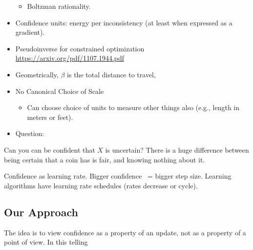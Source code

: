 \documentclass{article}
\begin{document}
\begin{itemize}
\begin{itemize}
    \item Boltzman rationality.
\end{itemize}


\item Confidence units: energy per inconsistency (at least when expressed as a gradient).

\item Pseudoinverse for constrained optimization
    \url{https://arxiv.org/pdf/1107.1944.pdf}

\item Geometrically, $\beta$ is the total distance to travel,

\item No Canonical Choice of Scale

\begin{itemize}
    \item Can choose choice of units to measure other things also (e.g., length in meters or feet).
\end{itemize}

\item Question:


\end{itemize}






Can you can be confident that $X$ is uncertain?
There is a huge difference between being certain that a coin has is fair, and knowing nothing about it.







Confidence as learning rate. Bigger confidence ~= bigger step size.
Learning algorithms have learning rate schedules (rates decrease or cycle).

\subsection*{Our Approach}
The idea is to view confidence as a property of an update, not as a property of a point of view.
In this telling
\end{document}
